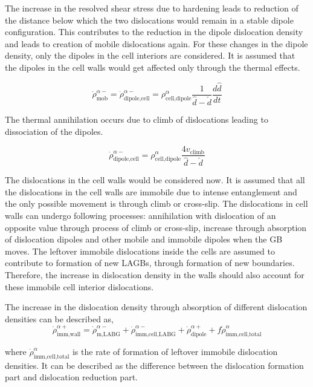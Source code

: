 \documentclass[a4paper,11pt]{article}
\begin{document}
The increase in the resolved shear stress due to hardening leads to reduction of the distance below which the two dislocations would remain in a stable dipole configuration. 
This contributes to the reduction in the dipole dislocation density and leads to creation of mobile dislocations again. 
For these changes in the dipole density, only the dipoles in the cell interiors are considered. 
It is assumed that the dipoles in the cell walls would get affected only through the thermal effects.

\begin{equation}
\dot\rho_{\text{mob}}^{\alpha-} = \dot\rho_{\text{dipole,cell}}^{\alpha-} = \rho_{\text{cell,dipole}}^{\alpha} \frac{1}{\hat{d} - \check{d}} \frac{d\hat{d}}{dt} \label{eq:17}
\end{equation} 

The thermal annihilation occurs due to climb of dislocations leading to dissociation of the dipoles. 

\begin{equation}
\dot\rho_{\text{dipole,cell}}^{\alpha-} = \rho_{\text{cell,dipole}}^{\alpha} \frac{4 v_{\text{climb}}}{\hat{d} - \check{d}} \label{eq:18}
\end{equation} 

The dislocations in the cell walls would be considered now. 
It is assumed that all the dislocations in the cell walls are immobile due to intense entanglement and the only possible movement is through climb or cross-slip. 
The dislocations in cell walls can undergo following processes: annihilation with dislocation of an opposite value through process of climb or cross-slip, 
increase through absorption of dislocation dipoles and other mobile and immobile dipoles when the GB moves. 
The leftover immobile dislocations inside the cells are assumed to contribute to formation of new LAGBs, through formation of new boundaries. 
Therefore, the increase in dislocation density in the walls should also account for these immobile cell interior dislocations.


The increase in the dislocation density through absorption of different dislocation densities can be described as,
\begin{equation}
\dot\rho_{\text{imm,wall}}^{\alpha+} = \dot\rho_{\text{m,LABG}}^{\alpha-} + \dot\rho_{\text{imm,cell,LABG}}^{\alpha-} + \dot\rho_{\text{dipole}}^{\alpha+} + f \dot\rho_{\text{imm,cell,total}}^{\alpha} \label{eq:19}
\end{equation} 

where \begin{math} \dot\rho_{\text{imm,cell,total}}^{\alpha} \end{math} is the rate of formation of leftover immobile dislocation densities.
It can be described as the difference between the dislocation formation part and dislocation reduction part. 
\end{document}
